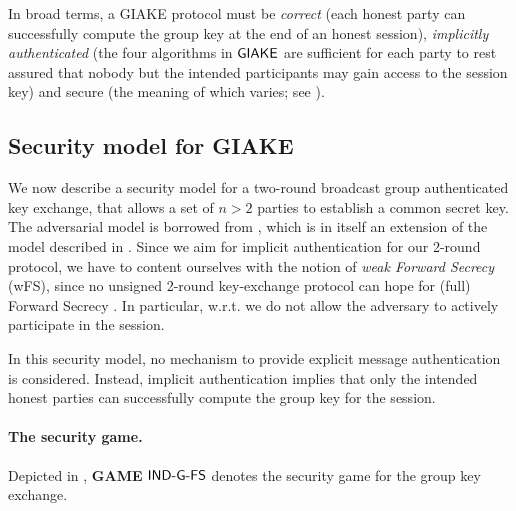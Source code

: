 	In broad terms, a GIAKE protocol must be \textit{correct} (each honest party can successfully compute the group key at the end of an honest session), \textit{implicitly authenticated} (the four algorithms in ${\mathsf{GIAKE}}$ are sufficient for each party to rest assured that nobody but the intended participants may gain access to the session key) and secure (the meaning of which varies; see ).

\subsection{Security model for GIAKE}\label{subsec:secmodel}
We now describe a security model for a two-round broadcast group authenticated key exchange, that allows a set of $n > 2$ parties to establish a common secret key.
The adversarial model is borrowed from \cite[Section 6.1]{JC:PanQiaRin22}, which is in itself an extension of the model described in \cite{EC:JKRS21}.
Since we aim for implicit authentication for our 2-round protocol, we have to content ourselves with the notion of \textit{weak Forward Secrecy} (wFS), since no unsigned 2-round key-exchange protocol can hope for (full) Forward Secrecy \cite[Section 3.2]{C:Krawczyk05}.
In particular, w.r.t. \cite[Section 6.1]{JC:PanQiaRin22} we do not allow the adversary to actively participate in the session.

In this security model, no mechanism to provide explicit message authentication is considered.
Instead, implicit authentication implies that only the intended honest parties can successfully compute the group key for the session.

\paragraph{The security game.}
Depicted in , {\textbf{GAME} $\mathsf{IND\mbox{-} G\mbox{-} FS}$} denotes the security game for the group key exchange. 

